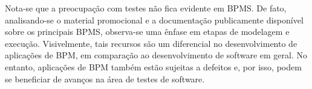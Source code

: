 \documentclass[12pt]{article}
\begin{document}


Nota-se que a preocupação com testes não fica evidente em BPMS. De fato, analisando-se o material promocional e a documentação publicamente disponível sobre os principais BPMS, observa-se uma ênfase em etapas de modelagem e execução. Visivelmente, tais recursos são um diferencial no desenvolvimento de aplicações de BPM, em comparação ao desenvolvimento de software em geral. No entanto, aplicações de BPM também estão sujeitas a defeitos e, por isso, podem se beneficiar de avanços na área de testes de software.






\end{document}
